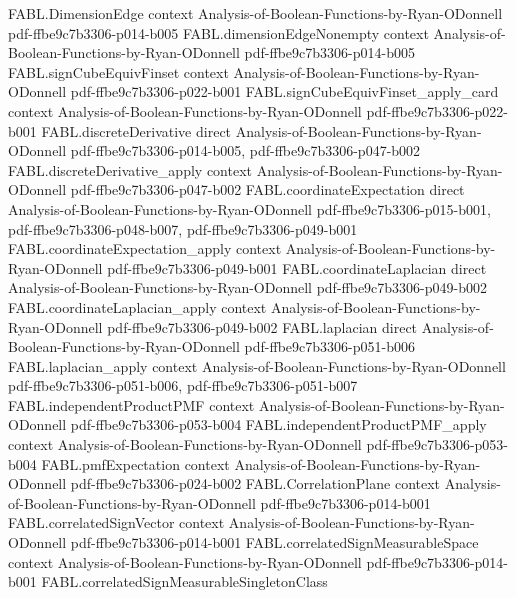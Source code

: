 \begin{theorem}
  {FABL.DimensionEdge}
  {context}
  {Analysis-of-Boolean-Functions-by-Ryan-ODonnell}
  {pdf-ffbe9c7b3306-p014-b005}
\proofstep
  {FABL.dimensionEdgeNonempty}
  {context}
  {Analysis-of-Boolean-Functions-by-Ryan-ODonnell}
  {pdf-ffbe9c7b3306-p014-b005}
\proofstep
  {FABL.signCubeEquivFinset}
  {context}
  {Analysis-of-Boolean-Functions-by-Ryan-ODonnell}
  {pdf-ffbe9c7b3306-p022-b001}
\proofstep
  {FABL.signCubeEquivFinset_apply_card}
  {context}
  {Analysis-of-Boolean-Functions-by-Ryan-ODonnell}
  {pdf-ffbe9c7b3306-p022-b001}
\proofstep
  {FABL.discreteDerivative}
  {direct}
  {Analysis-of-Boolean-Functions-by-Ryan-ODonnell}
  {pdf-ffbe9c7b3306-p014-b005,
    pdf-ffbe9c7b3306-p047-b002}
\proofstep
  {FABL.discreteDerivative_apply}
  {context}
  {Analysis-of-Boolean-Functions-by-Ryan-ODonnell}
  {pdf-ffbe9c7b3306-p047-b002}
\proofstep
  {FABL.coordinateExpectation}
  {direct}
  {Analysis-of-Boolean-Functions-by-Ryan-ODonnell}
  {pdf-ffbe9c7b3306-p015-b001,
    pdf-ffbe9c7b3306-p048-b007,
    pdf-ffbe9c7b3306-p049-b001}
\proofstep
  {FABL.coordinateExpectation_apply}
  {context}
  {Analysis-of-Boolean-Functions-by-Ryan-ODonnell}
  {pdf-ffbe9c7b3306-p049-b001}
\proofstep
  {FABL.coordinateLaplacian}
  {direct}
  {Analysis-of-Boolean-Functions-by-Ryan-ODonnell}
  {pdf-ffbe9c7b3306-p049-b002}
\proofstep
  {FABL.coordinateLaplacian_apply}
  {context}
  {Analysis-of-Boolean-Functions-by-Ryan-ODonnell}
  {pdf-ffbe9c7b3306-p049-b002}
\proofstep
  {FABL.laplacian}
  {direct}
  {Analysis-of-Boolean-Functions-by-Ryan-ODonnell}
  {pdf-ffbe9c7b3306-p051-b006}
\proofstep
  {FABL.laplacian_apply}
  {context}
  {Analysis-of-Boolean-Functions-by-Ryan-ODonnell}
  {pdf-ffbe9c7b3306-p051-b006,
    pdf-ffbe9c7b3306-p051-b007}
\proofstep
  {FABL.independentProductPMF}
  {context}
  {Analysis-of-Boolean-Functions-by-Ryan-ODonnell}
  {pdf-ffbe9c7b3306-p053-b004}
\proofstep
  {FABL.independentProductPMF_apply}
  {context}
  {Analysis-of-Boolean-Functions-by-Ryan-ODonnell}
  {pdf-ffbe9c7b3306-p053-b004}
\proofstep
  {FABL.pmfExpectation}
  {context}
  {Analysis-of-Boolean-Functions-by-Ryan-ODonnell}
  {pdf-ffbe9c7b3306-p024-b002}
\proofstep
  {FABL.CorrelationPlane}
  {context}
  {Analysis-of-Boolean-Functions-by-Ryan-ODonnell}
  {pdf-ffbe9c7b3306-p014-b001}
\proofstep
  {FABL.correlatedSignVector}
  {context}
  {Analysis-of-Boolean-Functions-by-Ryan-ODonnell}
  {pdf-ffbe9c7b3306-p014-b001}
\proofstep
  {FABL.correlatedSignMeasurableSpace}
  {context}
  {Analysis-of-Boolean-Functions-by-Ryan-ODonnell}
  {pdf-ffbe9c7b3306-p014-b001}
\proofstep
  {FABL.correlatedSignMeasurableSingletonClass}

\end{theorem}
